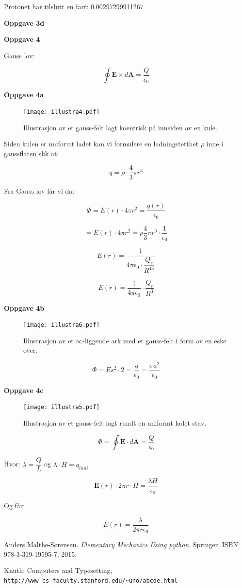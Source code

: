 \documentclass[a4paper,norsk,12pt]{article}
\begin{document}
Protonet har tilslutt en fart:  0.00297299911267

\textbf{Oppgave 3d}



\textbf{Oppgave 4}

Gauss lov:

$$ \oint \textbf{E} \times d \textbf{A} = \dfrac{Q}{\epsilon_0}$$

\textbf{Oppgave 4a}

\begin{figure}[H]
\centering
  \texttt{[image: illustra4.pdf]}
  \caption{Illustrasjon av et gauss-felt lagt koentrisk på innsiden av en kule.}
  \label{fig:plot10}
\end{figure}

Siden kulen er uniformt ladet kan vi formulere en ladningstetthet $\rho$ inne i gaussflaten slik at: 

$$ q = \rho \cdot \dfrac{4}{3} \pi r^{3} $$

Fra Gauss lov får vi da:

$$ \Phi = E(r) \cdot 4 \pi r^2 = \dfrac{q(r)}{\epsilon_0} $$

$$ = E(r) \cdot 4 \pi r^2 = \rho \dfrac{4}{3} \pi r^3 \cdot \dfrac{1}{\epsilon_0} $$

$$ E(r) = \dfrac{1}{4 \pi \epsilon_0 \cdot \dfrac{Q_r}{R^43}} $$

$$ E(r) = \dfrac{1}{4 \pi \epsilon_0} \cdot \dfrac{Q_r}{R^3} $$

\textbf{Oppgave 4b}

\begin{figure}[H]
\centering
  \texttt{[image: illustra6.pdf]}
  \caption{Illustrasjon av et $\infty$-liggende ark med et gauss-felt i form av en eske over.}
  \label{fig:plot11}
\end{figure}

$$ \Phi = E s^2 \cdot 2 = \dfrac{q}{\epsilon_0} = \dfrac{\sigma a^2}{\epsilon_0} $$

\textbf{Oppgave 4c}

\begin{figure}[H]
\centering
  \texttt{[image: illustra5.pdf]}
  \caption{Illustrasjon av et gauss-felt lagt rundt en uniformt ladet stav.}
  \label{fig:plot12}
\end{figure}

$$ \Phi = \oint \textbf{E} \cdot d \textbf{A} = \dfrac{Q}{\epsilon_0} $$

Hvor: $ \lambda = \dfrac{Q}{L}$ og  $ \lambda \cdot H = q_{inni} $

$$ \textbf{E} (r) \cdot 2 \pi r \cdot H = \dfrac{\lambda H}{\epsilon_0} $$

Og får:

$$ E(r) = \dfrac{\lambda}{2 \pi r \epsilon_0} $$

\medskip
 
\begin{thebibliography}{9}
 
Anders Malthe-Sørensen. 
\textit{Elementary Mechanics Using python}. 
Springer, ISBN 978-3-319-19595-7, 2015.
 
Knuth: Computers and Typesetting,
\\\texttt{http://www-cs-faculty.stanford.edu/\~{}uno/abcde.html}
\end{thebibliography}
\end{document}

